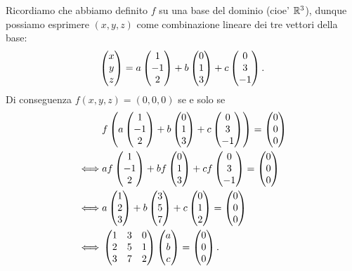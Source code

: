 \begin{example}
    Ricordiamo che abbiamo definito $f$ su una base del dominio (cioe' $\R^3$), dunque possiamo esprimere $(x, y, z)$ come combinazione lineare dei tre vettori della base: \[
        \mat{x\\y\\z} = a\mat{1\\-1\\2} + b\mat{0\\1\\3} + c\mat{0\\3\\-1}.
    \]
    Di conseguenza $f(x, y, z) = (0, 0, 0)$ se e solo se \begin{align*}
        &f\left(a\mat{1\\-1\\2} + b\mat{0\\1\\3} + c\mat{0\\3\\-1}\right) = \mat{0\\0\\0}\\
        \iff &af\mat{1\\-1\\2} + bf\mat{0\\1\\3} + cf\mat{0\\3\\-1} = \mat{0\\0\\0}\\
        \iff &a\mat{1\\2\\3} + b\mat{3\\5\\7} + c\mat{0\\1\\2} = \mat{0\\0\\0}\\
        \iff &\mat{1&3&0\\2&5&1\\3&7&2}\mat{a\\b\\c} = \mat{0\\0\\0}.
    \end{align*}


\end{example}
